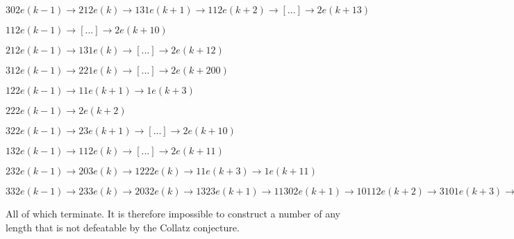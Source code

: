 \documentclass[10pt,a4paper,showpacs,nofootinbib,aps,superscriptaddress,eqsecnum,prd,showkeys,twocolumn,notitlepage]{article}
\begin{document}
$302e(k-1) \rightarrow 212e(k) \rightarrow 131e(k+1) \rightarrow 112e(k+2) \rightarrow [...] \rightarrow 2e(k+13)$

$112e(k-1) \rightarrow [...] \rightarrow 2e(k+10)$

$212e(k-1) \rightarrow 131e(k) \rightarrow [...] \rightarrow 2e(k+12)$

$312e(k-1) \rightarrow 221e(k) \rightarrow [...] \rightarrow 2e(k+200)$

$122e(k-1) \rightarrow 11e(k+1) \rightarrow 1e(k+3)$

$222e(k-1) \rightarrow 2e(k+2)$

$322e(k-1) \rightarrow 23e(k+1) \rightarrow [...] \rightarrow 2e(k+10)$

$132e(k-1) \rightarrow 112e(k) \rightarrow [...] \rightarrow 2e(k+11)$

$232e(k-1) \rightarrow 203e(k) \rightarrow 1222e(k) \rightarrow 11e(k+3) \rightarrow 1e(k+11)$

$332e(k-1) \rightarrow 233e(k) \rightarrow 2032e(k) \rightarrow 1323e(k+1) \rightarrow 11302e(k+1) \rightarrow 10112e(k+2) \rightarrow 3101e(k+3) \rightarrow 2131e(k+10) \rightarrow 1312e(k+11) \rightarrow 1121e(k+12) \rightarrow 1003e(k+13) \rightarrow 3022e(k+13) \rightarrow 212e(k+21) \rightarrow 131e(k+22) \rightarrow 112e(k+23) \rightarrow 101e(k+30) \rightarrow 31e(k+31) \rightarrow [...] \rightarrow 2e(k+100)$

All of which terminate. It is therefore impossible to construct a number of any length that is not defeatable by the Collatz conjecture.
\end{document}
